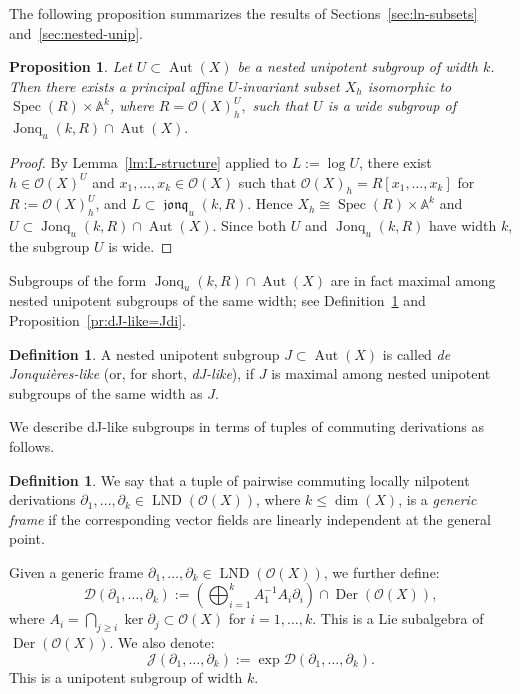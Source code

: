 \documentclass[12pt,a4paper]{amsart}
\theoremstyle{plain}
\newtheorem{proposition}[theorem]{Proposition}
\theoremstyle{definition}
\newtheorem{definition}[theorem]{Definition}
\theoremstyle{remark}
\def\Aut{\operatorname{Aut}}
\def\Der{\operatorname{Der}}
\def\LND{\operatorname{LND}}
\def\Spec{\operatorname{Spec}}
\def\AA{{\mathbb A}}
\def\cO{{\mathcal O}}
\def\J{{\mathcal J}}
\DeclareMathOperator{\Jonq}{Jonq}
\DeclareMathOperator{\jonq}{\mathfrak{jonq}}
\begin{document}
The following proposition summarizes the results of Sections~\ref{sec:ln-subsets} and~\ref{sec:nested-unip}.

\begin{proposition}\label{pr:U-wide-dJ}
   Let $U\subset\Aut(X)$ be a nested unipotent subgroup of width $k$.  Then there exists a principal affine $U$-invariant subset $X_h$ isomorphic to $\Spec(R)\times\AA^k$, where $R=\cO(X)^U_h,$ such that $U$ is a wide subgroup of $\Jonq_u(k,R)\cap\Aut(X).$
\end{proposition}
\begin{proof}
   By Lemma~\ref{lm:L-structure} applied to $L:=\log U$, there exist $h\in\cO(X)^U$ and $x_1,\ldots,x_k\in\cO(X)$ such that $\cO(X)_h=R[x_1,\ldots,x_k]$ for $R:=\cO(X)^U_h$, and $L\subset\jonq_u(k,R)$.
   Hence $X_h\cong\Spec(R)\times\AA^k$ and $U\subset\Jonq_u(k,R)\cap\Aut(X)$.
   Since both $U$ and $\Jonq_u(k,R)$ have width $k$, the subgroup $U$ is wide.
\end{proof}

Subgroups of the form $\Jonq_u(k,R)\cap\Aut(X)$ are in fact maximal among nested unipotent subgroups of the same width; see Definition~\ref{def:dJ-width} and Proposition~\ref{pr:dJ-like=Jdi}.

\begin{definition}\label{def:dJ-width}
   A nested unipotent subgroup $J\subset\Aut(X)$ is called \emph{de Jonqui\`eres-like} (or, for short, \emph{dJ-like}), if $J$ is maximal among nested unipotent subgroups of the same width as $J$.
\end{definition}

We describe dJ-like subgroups in terms of tuples of commuting derivations as follows.


\begin{definition}\label{def:gen-free-di}
   We say that a tuple of pairwise commuting locally nilpotent derivations $\partial_1,\ldots, \partial_k\in\LND(\cO(X))$, where $k\le\dim(X)$,
   is a \emph{generic frame} if the corresponding vector fields are linearly independent at the general point. 

   Given a generic frame $\partial_1,\ldots, \partial_k\in\LND(\cO(X))$, we further define:
   \begin{equation}\label{eq:D(di)}
      \mathcal{D}(\partial_1,\ldots,\partial_k):= \left(\bigoplus_{i=1}^k A_1^{-1}A_i\partial_i\right)\cap\Der(\cO(X)),  
   \end{equation}
   where $A_i=\bigcap_{j\ge i}\ker\partial_j\subset\cO(X)$ for $i=1,\ldots,k.$
   This is a Lie subalgebra of $\Der(\cO(X))$.
   We also denote:
   \[
      \J(\partial_1,\ldots,\partial_k):=\exp \mathcal{D}(\partial_1,\ldots,\partial_k).
   \]
   This is a unipotent subgroup of width $k$.
\end{definition}
\end{document}
